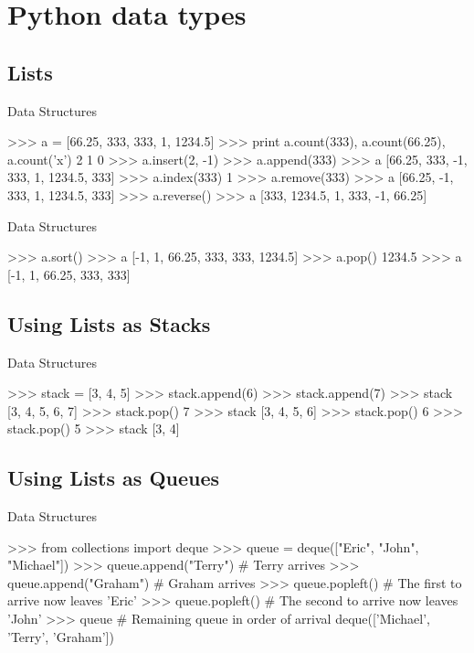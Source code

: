 \documentclass[11pt]{beamer}
\begin{document}
\section{Python data types}
\subsection{Lists}
\begin{frame}[containsverbatim]{Data Structures}
\begin{python}
>>> a = [66.25, 333, 333, 1, 1234.5]
>>> print a.count(333), a.count(66.25), a.count('x')
2 1 0
>>> a.insert(2, -1)
>>> a.append(333)
>>> a
[66.25, 333, -1, 333, 1, 1234.5, 333]
>>> a.index(333)
1
>>> a.remove(333)
>>> a
[66.25, -1, 333, 1, 1234.5, 333]
>>> a.reverse()
>>> a
[333, 1234.5, 1, 333, -1, 66.25]
\end{python}
\end{frame}


\begin{frame}[containsverbatim]{Data Structures}
\begin{python}
>>> a.sort()
>>> a
[-1, 1, 66.25, 333, 333, 1234.5]
>>> a.pop()
1234.5
>>> a
[-1, 1, 66.25, 333, 333]
\end{python}
\end{frame}

\subsection{Using Lists as Stacks}
\begin{frame}[containsverbatim]{Data Structures}
\begin{python}
>>> stack = [3, 4, 5]
>>> stack.append(6)
>>> stack.append(7)
>>> stack
[3, 4, 5, 6, 7]
>>> stack.pop()
7
>>> stack
[3, 4, 5, 6]
>>> stack.pop()
6
>>> stack.pop()
5
>>> stack
[3, 4]
\end{python}
\end{frame}

\subsection{Using Lists as Queues}
\begin{frame}[containsverbatim]{Data Structures}
\begin{python}
>>> from collections import deque
>>> queue = deque(["Eric", "John", "Michael"])
>>> queue.append("Terry")           # Terry arrives
>>> queue.append("Graham")          # Graham arrives
>>> queue.popleft()                 # The first to arrive now leaves
'Eric'
>>> queue.popleft()                 # The second to arrive now leaves
'John'
>>> queue                      # Remaining queue in order of arrival
deque(['Michael', 'Terry', 'Graham'])
\end{python}
\end{frame}
\end{document}
